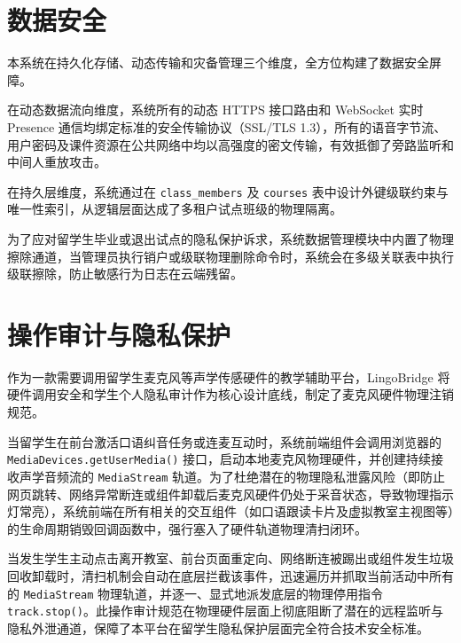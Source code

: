 \section{数据安全}
本系统在持久化存储、动态传输和灾备管理三个维度，全方位构建了数据安全屏障。

在动态数据流向维度，系统所有的动态 HTTPS 接口路由和 WebSocket 实时 Presence 通信均绑定标准的安全传输协议（SSL/TLS 1.3），所有的语音字节流、用户密码及课件资源在公共网络中均以高强度的密文传输，有效抵御了旁路监听和中间人重放攻击。

在持久层维度，系统通过在 \texttt{class\_members} 及 \texttt{courses} 表中设计外键级联约束与唯一性索引，从逻辑层面达成了多租户试点班级的物理隔离。

为了应对留学生毕业或退出试点的隐私保护诉求，系统数据管理模块中内置了物理擦除通道，当管理员执行销户或级联物理删除命令时，系统会在多级关联表中执行级联擦除，防止敏感行为日志在云端残留。

\section{操作审计与隐私保护}
作为一款需要调用留学生麦克风等声学传感硬件的教学辅助平台，LingoBridge 将硬件调用安全和学生个人隐私审计作为核心设计底线，制定了麦克风硬件物理注销规范。

当留学生在前台激活口语纠音任务或连麦互动时，系统前端组件会调用浏览器的 \texttt{MediaDevices.getUserMedia()} 接口，启动本地麦克风物理硬件，并创建持续接收声学音频流的 \texttt{MediaStream} 轨道。为了杜绝潜在的物理隐私泄露风险（即防止网页跳转、网络异常断连或组件卸载后麦克风硬件仍处于采音状态，导致物理指示灯常亮），系统前端在所有相关的交互组件（如口语跟读卡片及虚拟教室主视图等）的生命周期销毁回调函数中，强行塞入了硬件轨道物理清扫闭环。

当发生学生主动点击离开教室、前台页面重定向、网络断连被踢出或组件发生垃圾回收卸载时，清扫机制会自动在底层拦截该事件，迅速遍历并抓取当前活动中所有的 \texttt{MediaStream} 物理轨道，并逐一、显式地派发底层的物理停用指令 \texttt{track.stop()}。此操作审计规范在物理硬件层面上彻底阻断了潜在的远程监听与隐私外泄通道，保障了本平台在留学生隐私保护层面完全符合技术安全标准。
